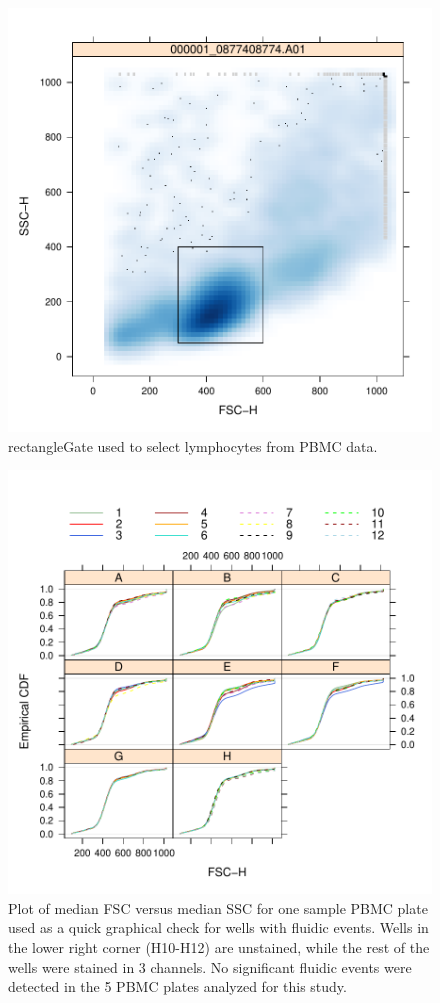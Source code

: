 \documentclass[12pt]{article}
\begin{document}
\begin{figure}
\includegraphics{outline-morphGate}
\caption{rectangleGate used to select lymphocytes from PBMC data.}
\label{fig:morphGate}
\end{figure}

\begin{figure}
\includegraphics{outline-fluidic}
\caption{Plot of median FSC versus median SSC for one sample PBMC plate used as a quick graphical check
for wells with fluidic events. Wells in the lower right corner (H10-H12) are unstained, while
the rest of the wells were stained in 3 channels. No significant fluidic events were detected in the 
5 PBMC plates analyzed for this study.}
\label{fig:fluidic}
\end{figure}
\end{document}
